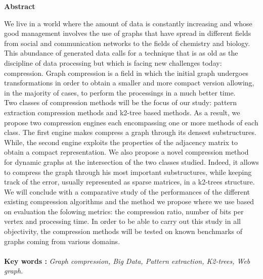 \newpage
\thispagestyle{plain}
\begin{center}
	\par
	\textbf{
		\vskip 0.5in
		\LARGE 
			Abstract \\[0.15in]
	}
\end{center}
	\par
    
    We live in a world where the amount of data is constantly increasing and whose good management involves the use of graphs that have spread in different fields from social and communication networks to the fields of chemistry and biology. This abundance of generated data calls for a technique that is as old as the discipline of data processing but which is facing new challenges today: compression. Graph compression is a field in which the initial graph undergoes transformations in order to obtain a smaller and more compact version allowing, in the majority of cases, to perform the processings in a much better time.\\

 Two classes of compression methods will be the focus of our study: pattern extraction compression methods and k2-tree based methods. As a result, we propose two compression engines each encompassing one or more methods of each class. The first engine makes  compress a graph through its densest substructures. While, the second engine exploits the properties of the adjacency matrix to obtain a compact representation. We also propose a novel compression method for dynamic graphs at the intersection of the two classes studied. Indeed, it allows to compress the graph through his most important substructures, while keeping track of the error, usually represented as sparse matrices, in a k2-trees structure.\\
 
 We will conclude with a comparative study of the performances of the different existing compression algorithms and the method we propose where we use based on evaluation the folowing metrics: the compression ratio, number of bits per vertex and processing time. In order to be able to carry out this study in all objectivity, the compression methods will be tested on known benchmarks of graphs coming from various domains. \\\\\textbf{Key words :} \textit{Graph compression, Big Data, Pattern extraction, K2-trees, Web graph.}

\newpage
 


